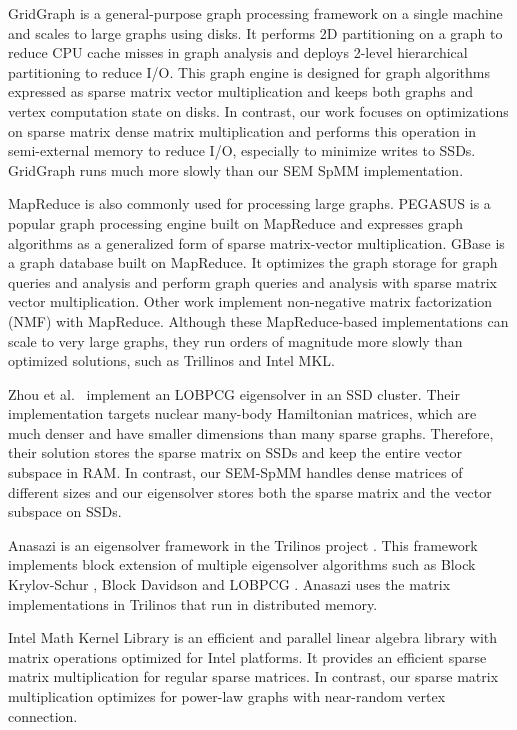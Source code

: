GridGraph \cite{gridgraph} is a general-purpose graph processing framework on
a single machine
and scales to large graphs using disks. It performs 2D partitioning on a graph
to reduce CPU cache misses in graph analysis and deploys 2-level hierarchical
partitioning to reduce I/O. This graph engine is designed for graph
algorithms expressed as sparse matrix vector multiplication and keeps both
graphs and vertex computation state on disks. In contrast, our work focuses on
optimizations on sparse matrix dense matrix multiplication and performs this
operation in semi-external memory to reduce I/O, especially to minimize writes
to SSDs. GridGraph runs much more slowly than our SEM SpMM implementation.

MapReduce \cite{MapReduce} is also commonly used for processing large graphs.
PEGASUS \cite{pegasus} is a popular graph processing engine built on MapReduce
and expresses graph algorithms as a generalized form of sparse matrix-vector
multiplication. GBase \cite{gbase} is a graph database built on MapReduce.
It optimizes the graph storage for graph queries and analysis and perform graph
queries and analysis with sparse matrix vector multiplication.
Other work \cite{Liao14, Yin14, Liu10} implement non-negative matrix
factorization (NMF) with MapReduce. Although these MapReduce-based
implementations can scale to very large graphs, they run orders of
magnitude more slowly than optimized solutions, such as Trillinos and Intel MKL.

Zhou et al.~\cite{Zhou12} implement an LOBPCG \cite{Arbenz05} eigensolver in
an SSD cluster. Their implementation targets nuclear many-body Hamiltonian
matrices, which are much denser and have smaller dimensions than many sparse
graphs. Therefore, their solution stores the sparse matrix on SSDs and keep
the entire vector subspace in RAM. In contrast, our SEM-SpMM handles dense
matrices of different sizes and our eigensolver stores both the sparse matrix
and the vector subspace on SSDs.

Anasazi \cite{anasazi} is an eigensolver framework in the Trilinos project
\cite{trilinos}. This framework implements block extension of multiple
eigensolver algorithms such as Block Krylov-Schur \cite{krylovschur},
Block Davidson \cite{Arbenz05} and LOBPCG \cite{Arbenz05}. Anasazi uses
the matrix implementations in Trilinos that run in distributed memory.

Intel Math Kernel Library \cite{mkl} is an efficient and parallel linear
algebra library with matrix operations optimized for Intel
platforms. It provides an efficient sparse matrix multiplication
for regular sparse matrices. In contrast, our sparse matrix multiplication
optimizes for power-law graphs with near-random vertex connection.
